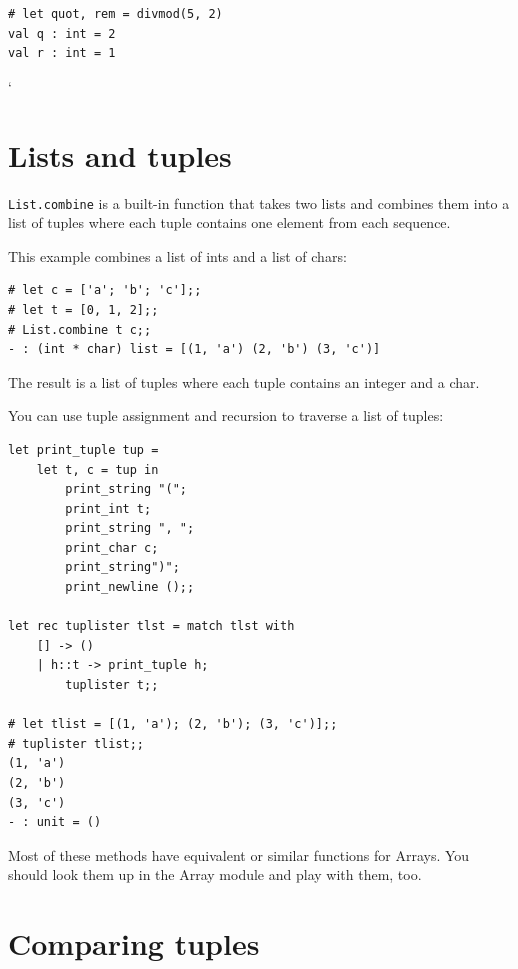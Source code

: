 \documentclass[10pt]{book}
\begin{document}

\beforeverb
\begin{verbatim}
# let quot, rem = divmod(5, 2)
val q : int = 2
val r : int = 1
\end{verbatim}
`\afterverb

\section{Lists and tuples}


{\tt List.combine} is a built-in function that takes two lists and
combines them into a list of tuples where each tuple contains one 
element from each sequence.

This example combines a list of ints and a list of chars:

\beforeverb
\begin{verbatim}
# let c = ['a'; 'b'; 'c'];;
# let t = [0, 1, 2];;
# List.combine t c;;
- : (int * char) list = [(1, 'a') (2, 'b') (3, 'c')]
\end{verbatim}
\afterverb
%
The result is a list of tuples where each tuple contains
an integer and a char.


You can use tuple assignment and recursion to traverse a list of
tuples:


\beforeverb
\begin{verbatim}
let print_tuple tup = 
	let t, c = tup in
		print_string "(";
		print_int t;
		print_string ", ";
		print_char c;
		print_string")";
		print_newline ();;

let rec tuplister tlst = match tlst with 
	[] -> ()
	| h::t -> print_tuple h;
		tuplister t;;

# let tlist = [(1, 'a'); (2, 'b'); (3, 'c')];;
# tuplister tlist;;
(1, 'a')
(2, 'b')
(3, 'c')
- : unit = () 
\end{verbatim}
\afterverb

\begin{ex}
Most of these methods have equivalent or similar functions for Arrays. You should look them up in the Array module and play with them, too.
\end{ex}

\section{Comparing tuples}
\end{document}
